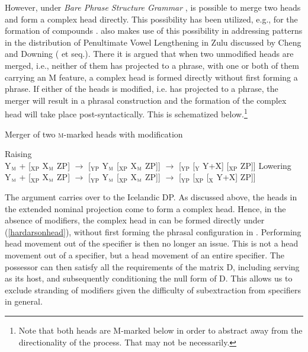 \documentclass[output=paper,colorlinks,citecolor=brown,
]{langscibook}
\begin{document}
However, under \textit{Bare Phrase Structure Grammar} \citep{Chomsky:1995uq}, is possible to merge two heads and form a complex head directly. This possibility has been utilized, e.g., for the formation of compounds \citep[e.g.,][]{Josefsson:1997te,josefsson1998,zhang2007,Siddiqi:2009tm,okubo2013,Hardarson:2018vo}. \citet{hardarson2020} also makes use of this possibility in addressing patterns in the distribution of Penultimate Vowel Lengthening in Zulu discussed by Cheng and Downing (\citeyear{Cheng:2007um} et seq.). There it is argued that when two unmodified heads are merged, i.e., neither of them has projected to a phrase, with one or both of them carrying an M feature, a complex head is formed directly without first forming a phrase. If either of the heads is modified, i.e. has projected to a phrase, the merger will result in a phrasal construction and the formation of the complex head will take place post-syntactically. This is schematized below.\footnote{Note that both heads are M-marked below in order to abstract away from the directionality of the process. That may not be necessarily.}

\begin{exe}
	 \citep[468]{hardarson2020} \label{hardarsonhead}
			\begin{xlist}
			\end{xlist}
	\ex	Merger of two \textsc{m}-marked heads with modification \citep[468]{hardarson2020} \label{hardarsonhead+}
		\begin{xlist}
			\ex	Raising\\
				Y$_{\textsc{m}}$ + [$_{\mathrm{XP}}$ X$_{\textsc{m}}$ ZP] $\rightarrow$ [$_{\mathrm{YP}}$ Y$_{\textsc{m}}$ [$_{\mathrm{XP}}$ X$_{\textsc{m}}$ ZP]] $\rightarrow$ [$_{\mathrm{YP}}$ [$_{\mathrm{Y}}$ Y+X] [$_{\mathrm{XP}}$  ZP]]
			\ex Lowering\\
				Y$_{\textsc{m}}$ + [$_{\mathrm{XP}}$ X$_{\textsc{m}}$ ZP] $\rightarrow$ [$_{\mathrm{YP}}$ Y$_{\textsc{m}}$ [$_{\mathrm{XP}}$ X$_{\textsc{m}}$ ZP]] $\rightarrow$ [$_{\mathrm{YP}}$  [$_{\mathrm{XP}}$ [$_{\mathrm{X}}$ Y+X]  ZP]]
		\end{xlist}
\end{exe} 


\noindent The argument carries over to the Icelandic DP. As discussed above, the heads in the extended nominal projection come to form a complex head. Hence, in the absence of modifiers, the complex head in  can be formed directly under (\ref{hardarsonhead}), without first forming the phrasal configuration in . Performing head movement out of the specifier is then no longer an issue. This is not a head movement out of a specifier, but a head movement of an entire specifier. The possessor can then satisfy all the requirements of the matrix D, including serving as its host, and subsequently conditioning the null form of D. This allows us to exclude stranding of modifiers given the difficulty of subextraction from specifiers in general.
\end{document}
